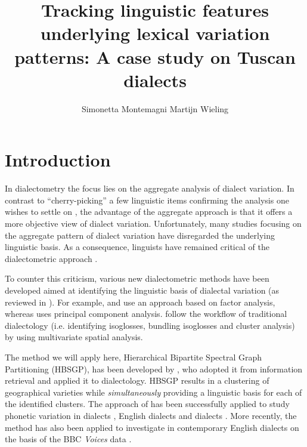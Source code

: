 \documentclass[output=paper]{LSP/langsci}
\author{Simonetta Montemagni\affiliation{Istituto di Linguistica Computazionale “Antonio Zampolli”, ILC-CNR} \lastand Martijn Wieling\affiliation{University of Groningen, CLCG}}
\title{Tracking linguistic features underlying lexical variation patterns: {A} case study on {T}uscan dialects}
\begin{document}
 
 
% 

% 
% 
% 
% 

\section{Introduction}
In dialectometry \citep{seguy_relation_1971} the focus lies on the aggregate analysis of dialect variation. In contrast to “cherry-picking” a few linguistic items confirming the analysis one wishes to settle on \citep{nerbonne_data-driven_2009}, the advantage of the aggregate approach is that it offers a more objective view of dialect variation. Unfortunately, many studies focusing on the aggregate pattern of dialect variation have disregarded the underlying linguistic basis. As a consequence, linguists have remained critical of the dialectometric approach \citep{schneider_qualitative_1988,woolhiser_political_2005, loporcaro_profilo_2009}. 

To counter this criticism, various new dialectometric methods have been developed aimed at identifying the linguistic basis of dialectal variation (as reviewed in \citealt{wieling_advances_2015}). For example, \citet{nerbonne_identifying_2006} and \citet{proll_latente_inpress} use an approach based on factor analysis, whereas \citet{shackleton_english-american_2005} uses principal component analysis. \citet{grieve_statistical_2011} follow the workflow of traditional dialectology (i.e. identifying isoglosses, bundling isoglosses and cluster analysis) by using multivariate spatial analysis. 

The method we will apply here, Hierarchical Bipartite Spectral Graph Partitioning (HBSGP), has been developed by \citet{wieling_bipartite_2009,wieling_hierarchical_2010, wieling_bipartite_2011}, who adopted it from information retrieval \citep{dhillon_co-clustering_2001} and applied it to dialectology. HBSGP results in a clustering of geographical varieties while \emph{simultaneously }providing a linguistic basis for each of the identified clusters. The approach of \citet{wieling_bipartite_2011} has been successfully applied to study phonetic variation in  dialects \citep{wieling_bipartite_2011}, English dialects \citep{wieling_analyzing_2013} and  dialects \citep{montemagni_patterns_2012,montemagni_synchronic_2013}. More recently, the method has also been applied to investigate  in contemporary English dialects on the basis of the BBC \textit{Voices} data \citep{wieling_lexical_2014}.
\end{document}
